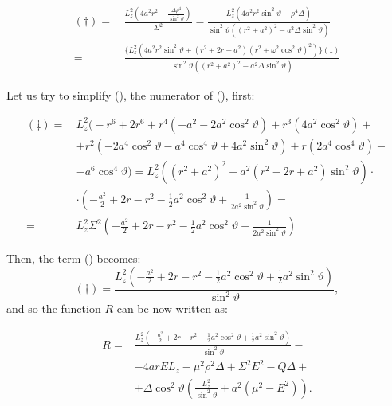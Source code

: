 \begin{align}
	(\dag) =\,& \frac{L_z^2 \left(4a^2r^2 - \frac{\Delta\rho^4}{\sin^2\vartheta}\right)}{\Sigma^2} = \frac{L_z^2 \left(4a^2r^2\sin^2\vartheta - \rho^4\Delta \right)}{\sin^2\vartheta\left(\left(r^2+a^2\right)^2 - a^2\Delta\sin^2\vartheta\right)} \nonumber \\
	=\,& \frac{\Biggl\{L_z^2\left(4a^2r^2\sin^2\vartheta+\left(r^2+2r-a^2\right)\left(r^2+\omega^2\cos^2\vartheta\right)^2\right)\Biggr\}(\ddag)}{\sin^2\vartheta\left(\left(r^2+a^2\right)^2-a^2\Delta\sin^2\vartheta\right)}
\end{align}

Let us try to simplify (\ddag), the numerator of (\dag), first:

\begin{align}
	(\ddag) =\,& L_z^2 \Biggl( -r^6 + 2r^6 + r^4 \left( -a^2 - 2a^2\cos^2\vartheta \right) + r^3\left(4 a^2 \cos^2\vartheta \right) + \nonumber \\
	&+ r^2 \left( -2a^4\cos^2\vartheta - a^4\cos^4\vartheta + 4a^2\sin^2\vartheta\right) + r\left(2a^4\cos^4\vartheta\right) - \nonumber \\
	&- a^6\cos^4\vartheta \Biggr) = L_z^2 \left( \left(r^2 + a^2\right)^2 - a^2 \left(r^2 - 2r + a^2\right)\sin^2\vartheta \right) \cdot \nonumber \\
	&\cdot \left( -\frac{a^2}{2} + 2r - r^2 - \frac{1}{2}a^2\cos^2\vartheta + \frac{1}{2a^2\sin^2\vartheta} \right) = \nonumber\\
	=\,& L_z^2 \Sigma^2 \left( -\frac{a^2}{2} + 2r - r^2 - \frac{1}{2}a^2\cos^2\vartheta + \frac{1}{2a^2\sin^2\vartheta} \right)
\end{align}

Then, the term (\dag) becomes:
\[
	(\dag) = \frac{L_z^2 \left( -\frac{a^2}{2} + 2r - r^2 - \frac{1}{2}a^2\cos^2\vartheta + \frac{1}{2}a^2\sin^2\vartheta\right) }{\sin^2\vartheta},
\]
and so the function $R$ can be now written as:

\begin{align}
	R =& \frac{L_z^2 \left( -\frac{a^2}{2} + 2r - r^2 - \frac{1}{2}a^2\cos^2\vartheta + \frac{1}{2}a^2\sin^2\vartheta\right) }{\sin^2\vartheta} - \nonumber\\
	&- 4 a r E L_z - \mu^2 \rho^2 \Delta + \Sigma^2 E^2 - Q \Delta + \nonumber \\ 
	&+ \Delta\cos^2\vartheta\left(\frac{L_z^2}{\sin^2\vartheta} + a^2\left(\mu^2 - E^2\right)\right).
\end{align}

